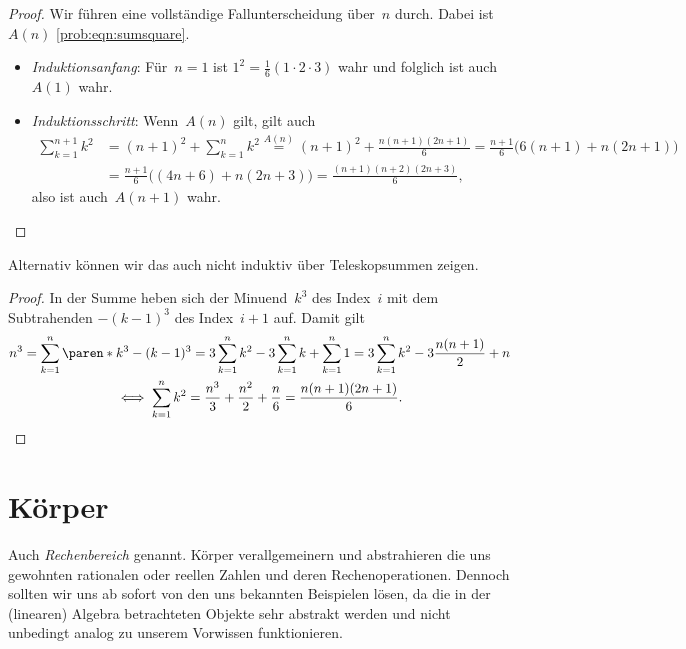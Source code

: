 \documentclass[a4paper]{article}
\begin{document}
\begin{solution}
    \begin{proof}
        Wir führen eine vollständige Fallunterscheidung über~$n$ durch. Dabei ist~$A(n)$ \cref{prob:eqn:sumsquare}.

        \begin{itemize}
            \item \emph{Induktionsanfang}: Für~$n = 1$ ist $1^2 = \frac{1}{6} (1 \cdot 2 \cdot 3)$ wahr und folglich ist auch $A(1)$ wahr.
            \item \emph{Induktionsschritt}: Wenn~$A(n)$ gilt, gilt auch
                  \begin{align*}
                      \sum_{k=1}^{n+1} k^2 & = (n+1)^2 + \sum_{k=1}^n k^2 \overset{A(n)}{=} (n+1)^2 + \frac{n(n+1)(2n+1)}{6} = \frac{n+1}{6} \bigl(6(n+1) + n(2n+1)\bigr) \\
                                           & = \frac{n+1}{6} \bigl((4n+6) + n(2n+3)\bigr) = \frac{(n+1) (n+2) (2n+3)}{6},
                  \end{align*}
                  also ist auch~$A(n+1)$ wahr.\qedhere
        \end{itemize}
    \end{proof}

    Alternativ können wir das auch nicht induktiv über Teleskopsummen zeigen.

    \begin{proof}
        In der Summe heben sich der Minuend~$k^3$ des Index~$i$ mit dem Subtrahenden $-(k-1)^3$ des Index~$i+1$ auf. Damit gilt
        \begin{gather*}
            n^3 = \sum_{k=1}^n \paren*{k^3 - (k-1)^3} = 3\sum_{k=1}^n k^2 - 3\sum_{k=1}^n k + \sum_{k=1}^n 1 = 3\sum_{k=1}^n k^2 - 3\frac{n (n+1)}{2} + n \\
            \iff \sum_{k=1}^n k^2 = \frac{n^3}{3} + \frac{n^2}{2} + \frac{n}{6} = \frac{n (n+1) (2n+1)}{6}. \qedhere
        \end{gather*}
    \end{proof}
\end{solution}

\section{Körper}

Auch \emph{Rechenbereich} genannt. Körper verallgemeinern und abstrahieren die uns gewohnten rationalen oder reellen Zahlen und deren Rechenoperationen. Dennoch sollten wir uns ab sofort von den uns bekannten Beispielen lösen, da die in der (linearen) Algebra betrachteten Objekte sehr abstrakt werden und nicht unbedingt analog zu unserem Vorwissen funktionieren.
\end{document}
